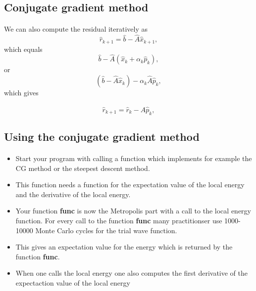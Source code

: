 \documentclass[%
twoside,                 %
final,                   %
10pt]{article}
\begin{document}
\subsection*{Conjugate gradient method}

\paragraph{}
We can also  compute the residual iteratively as
\begin{equation*}
\hat{r}_{k+1}=\hat{b}-\hat{A}\hat{x}_{k+1},
 \end{equation*}
which equals
\begin{equation*}
\hat{b}-\hat{A}(\hat{x}_k+\alpha_k\hat{p}_k),
 \end{equation*}
or
\begin{equation*}
(\hat{b}-\hat{A}\hat{x}_k)-\alpha_k\hat{A}\hat{p}_k,
 \end{equation*}
which gives

\begin{equation*}
\hat{r}_{k+1}=\hat{r}_k-\hat{A}\hat{p}_{k},
 \end{equation*}




\subsection*{Using the conjugate gradient method}

\paragraph{}
\begin{itemize}
  \item Start your program with calling a function which implements for example the  CG method  or the steepest descent method. 

  \item This function needs a function for the expectation value of the local energy and the derivative of the local energy.

  \item Your function \textbf{func} is now the Metropolis part with a call to the local energy function. For every call to the function \textbf{func} many practitionser use 1000-10000 Monte Carlo cycles for the trial wave function.

  \item This gives an expectation value for the energy which is returned by the function \textbf{func}.

  \item When one calls the local energy one also computes the first derivative of the expectaction value of the local energy  
\end{itemize}
\end{document}
